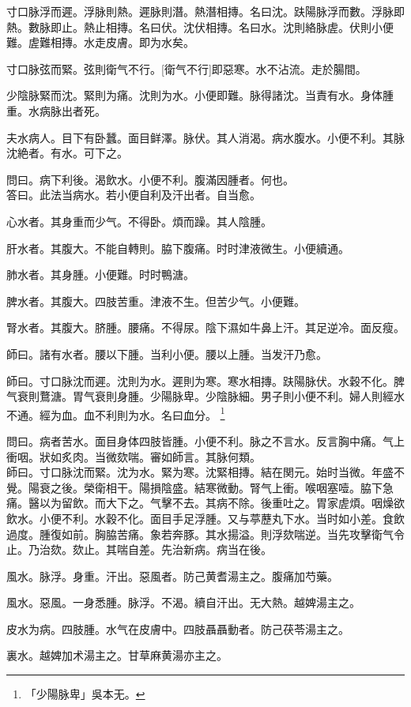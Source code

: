 \documentclass[12pt,twoside,UTF8,b5paper]{ctexbook}
\begin{document}
寸口脉浮而遲。浮脉則熱。遲脉則潛。熱潛相摶。名曰沈。趺陽脉浮而數。浮脉即熱。數脉即止。熱止相摶。名曰伏。沈伏相摶。名曰水。沈則絡脉虗。伏則小便難。虗難相摶。水走皮膚。即为水矣。

寸口脉弦而緊。弦則衛气不行。[衛气不行]即惡寒。水不沾流。走於腸間。

少陰脉緊而沈。緊則为痛。沈則为水。小便即難。脉得諸沈。当責有水。身体腫重。水病脉出者死。

夫水病人。目下有卧蠶。面目鲜澤。脉伏。其人消渴。病水腹水。小便不利。其脉沈絶者。有水。可下之。

問曰。病下利後。渴飲水。小便不利。腹滿因腫者。何也。\\
答曰。此法当病水。若小便自利及汗出者。自当愈。

心水者。其身重而少气。不得卧。煩而躁。其人陰腫。

肝水者。其腹大。不能自轉則。脇下腹痛。时时津液微生。小便續通。

肺水者。其身腫。小便難。时时鴨溏。

脾水者。其腹大。四肢苦重。津液不生。但苦少气。小便難。

腎水者。其腹大。脐腫。腰痛。不得尿。陰下濕如牛鼻上汗。其足逆冷。面反瘦。

師曰。諸有水者。腰以下腫。当利小便。腰以上腫。当发汗乃愈。

師曰。寸口脉沈而遲。沈則为水。遲則为寒。寒水相摶。趺陽脉伏。水穀不化。脾气衰則鶩溏。胃气衰則身腫。少陽脉卑。少陰脉細。男子則小便不利。婦人則經水不通。經为血。血不利則为水。名曰血分。
	\footnote{「少陽脉卑」吳本无。}

問曰。病者苦水。面目身体四肢皆腫。小便不利。脉之不言水。反言胸中痛。气上衝咽。狀如炙肉。当微欬喘。審如師言。其脉何類。\\
師曰。寸口脉沈而緊。沈为水。緊为寒。沈緊相摶。結在関元。始时当微。年盛不覺。陽衰之後。榮衛相干。陽損陰盛。結寒微動。腎气上衝。喉咽塞噎。脇下急痛。醫以为留飲。而大下之。气擊不去。其病不除。後重吐之。胃家虗煩。咽燥欲飲水。小便不利。水穀不化。面目手足浮腫。又与葶藶丸下水。当时如小差。食飲過度。腫復如前。胸脇苦痛。象若奔豚。其水揚溢。則浮欬喘逆。当先攻擊衛气令止。乃治欬。欬止。其喘自差。先治新病。病当在後。

風水。脉浮。身重。汗出。惡風者。防己黄耆湯主之。腹痛加芍藥。

風水。惡風。一身悉腫。脉浮。不渴。續自汗出。无大熱。越婢湯主之。

皮水为病。四肢腫。水气在皮膚中。四肢聶聶動者。防己茯苓湯主之。

裏水。越婢加术湯主之。甘草麻黄湯亦主之。
\end{document}
